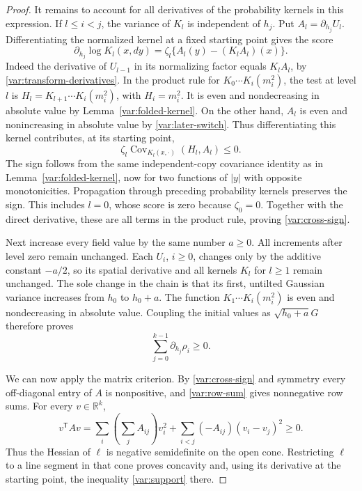 \begin{proof}
It remains to account for all derivatives of the probability
kernels in this expression. If $l\le i<j$, the variance of
$K_l$ is independent of $h_j$. Put
$A_l=\partial_{h_j}U_l$. Differentiating the normalized kernel
at a fixed starting point gives the score
\begin{equation}
\label{var:kernel-score}
 \partial_{h_j}\log K_l(x,dy)
 =\zeta_l\{A_l(y)-(K_lA_l)(x)\}.
\end{equation}
Indeed the derivative of $U_{l-1}$ in its normalizing factor
equals $K_l A_l$, by
\eqref{var:transform-derivatives}. In the product rule for
$K_0\cdots K_i(m_i^2)$, the test at level $l$ is
$H_l=K_{l+1}\cdots K_i(m_i^2)$, with $H_i=m_i^2$.
It is even and nondecreasing in absolute value by
Lemma~\ref{var:folded-kernel}. On the other hand, $A_l$ is even
and nonincreasing in absolute value by
\eqref{var:later-switch}. Thus differentiating this kernel
contributes, at its starting point,
\[
 \zeta_l\operatorname{Cov}_{K_l(x,\cdot)}(H_l,A_l)\le0.
\]
The sign follows from the same independent-copy covariance
identity as in Lemma~\ref{var:folded-kernel}, now for two
functions of $|y|$ with opposite monotonicities. Propagation
through preceding probability kernels preserves the sign.
This includes $l=0$, whose score is zero because $\zeta_0=0$.
Together with the direct derivative, these are all terms in the
product rule, proving \eqref{var:cross-sign}.

Next increase every field value by the same number $a\ge0$.
All increments after level zero remain unchanged. Each $U_i$,
$i\ge0$, changes only by the additive constant $-a/2$, so its
spatial derivative and all kernels $K_l$ for $l\ge1$ remain
unchanged. The sole change in the chain is that its first,
untilted Gaussian variance increases from $h_0$ to $h_0+a$.
The function
$K_1\cdots K_i(m_i^2)$ is even and nondecreasing in absolute
value. Coupling the initial values as
$\sqrt{h_0+a}G$ therefore proves
\begin{equation}
\label{var:row-sum}
 \sum_{j=0}^{k-1}\partial_{h_j}\rho_i\ge0.
\end{equation}

We can now apply the matrix criterion. By \eqref{var:cross-sign}
and symmetry every off-diagonal entry of $A$ is nonpositive,
and \eqref{var:row-sum} gives nonnegative row sums. For every
$v\in\mathbb R^k$,
\begin{equation}
\label{var:psd}
 v^{\mathsf T}Av
 =\sum_i\left(\sum_jA_{ij}\right)v_i^2
   +\sum_{i<j}(-A_{ij})(v_i-v_j)^2\ge0.
\end{equation}
Thus the Hessian of $\ell$ is negative semidefinite on the
open cone. Restricting $\ell$ to a line segment in that cone
proves concavity and, using its derivative at the starting
point, the inequality \eqref{var:support} there.


\end{proof}
